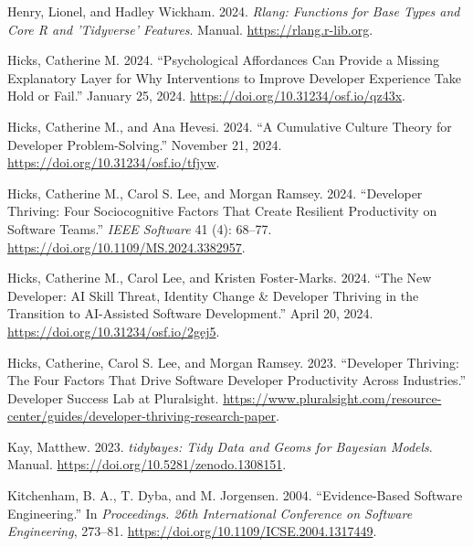 \documentclass[
]{article}
\newlength{\cslhangindent}
\newenvironment{CSLReferences}[2] %
 {\begin{list}{}{%
  \setlength{\itemindent}{0pt}
  \setlength{\leftmargin}{0pt}
  \setlength{\parsep}{0pt}
  \ifodd #1
   \setlength{\leftmargin}{\cslhangindent}
   \setlength{\itemindent}{-1\cslhangindent}
  \fi
  \setlength{\itemsep}{#2\baselineskip}}}
 {\end{list}}
\begin{document}
\begin{CSLReferences}{1}{0}
Henry, Lionel, and Hadley Wickham. 2024. \emph{Rlang: {Functions} for
Base Types and Core {R} and 'Tidyverse' Features}. Manual.
\url{https://rlang.r-lib.org}.

Hicks, Catherine M. 2024. {``Psychological {Affordances Can Provide} a
{Missing Explanatory Layer} for {Why Interventions} to {Improve
Developer Experience Take Hold} or {Fail}.''} January 25, 2024.
\url{https://doi.org/10.31234/osf.io/qz43x}.

Hicks, Catherine M., and Ana Hevesi. 2024. {``A {Cumulative Culture
Theory} for {Developer Problem-Solving}.''} November 21, 2024.
\url{https://doi.org/10.31234/osf.io/tfjyw}.

Hicks, Catherine M., Carol S. Lee, and Morgan Ramsey. 2024. {``Developer
{Thriving}: {Four Sociocognitive Factors That Create Resilient
Productivity} on {Software Teams}.''} \emph{IEEE Software} 41 (4):
68--77. \url{https://doi.org/10.1109/MS.2024.3382957}.

Hicks, Catherine M., Carol Lee, and Kristen Foster-Marks. 2024. {``The
{New Developer}: {AI Skill Threat}, {Identity Change} \& {Developer
Thriving} in the {Transition} to {AI-Assisted Software Development}.''}
April 20, 2024. \url{https://doi.org/10.31234/osf.io/2gej5}.

Hicks, Catherine, Carol S. Lee, and Morgan Ramsey. 2023. {``Developer
{Thriving}: {The} Four Factors That Drive {Software Developer
Productivity} Across {Industries}.''} Developer Success Lab at
Pluralsight.
\url{https://www.pluralsight.com/resource-center/guides/developer-thriving-research-paper}.

Kay, Matthew. 2023. \emph{{tidybayes}: {Tidy} Data and Geoms for
{Bayesian} Models}. Manual.
\url{https://doi.org/10.5281/zenodo.1308151}.

Kitchenham, B. A., T. Dyba, and M. Jorgensen. 2004. {``Evidence-Based
Software Engineering.''} In \emph{Proceedings. 26th {International
Conference} on {Software Engineering}}, 273--81.
\url{https://doi.org/10.1109/ICSE.2004.1317449}.


\end{CSLReferences}
\end{document}
